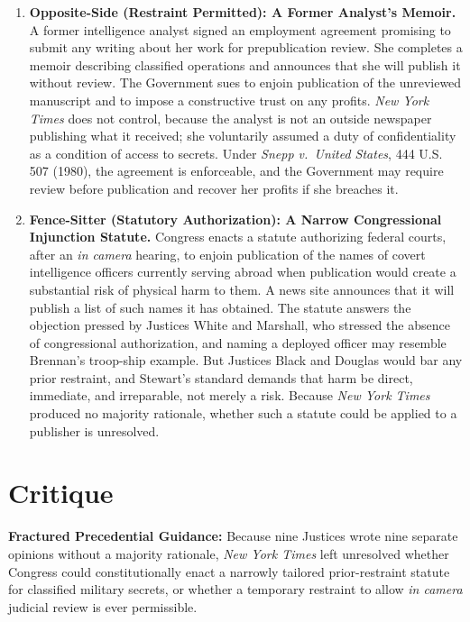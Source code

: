 \documentclass[12pt]{article}
\begin{document}
\begin{enumerate}
\item \textbf{Opposite-Side (Restraint Permitted): A Former Analyst's Memoir.} A former intelligence analyst signed an employment agreement promising to submit any writing about her work for prepublication review. She completes a memoir describing classified operations and announces that she will publish it without review. The Government sues to enjoin publication of the unreviewed manuscript and to impose a constructive trust on any profits. \textit{New York Times} does not control, because the analyst is not an outside newspaper publishing what it received; she voluntarily assumed a duty of confidentiality as a condition of access to secrets. Under \textit{Snepp v.\ United States}, 444 U.S. 507 (1980), the agreement is enforceable, and the Government may require review before publication and recover her profits if she breaches it.

\item \textbf{Fence-Sitter (Statutory Authorization): A Narrow Congressional Injunction Statute.} Congress enacts a statute authorizing federal courts, after an \textit{in camera} hearing, to enjoin publication of the names of covert intelligence officers currently serving abroad when publication would create a substantial risk of physical harm to them. A news site announces that it will publish a list of such names it has obtained. The statute answers the objection pressed by Justices White and Marshall, who stressed the absence of congressional authorization, and naming a deployed officer may resemble Brennan's troop-ship example. But Justices Black and Douglas would bar any prior restraint, and Stewart's standard demands that harm be direct, immediate, and irreparable, not merely a risk. Because \textit{New York Times} produced no majority rationale, whether such a statute could be applied to a publisher is unresolved.

\end{enumerate}

\section{Critique}
\textbf{Fractured Precedential Guidance:} Because nine Justices wrote nine separate opinions without a majority rationale, \textit{New York Times} left unresolved whether Congress could constitutionally enact a narrowly tailored prior-restraint statute for classified military secrets, or whether a temporary restraint to allow \textit{in camera} judicial review is ever permissible.
\end{document}
